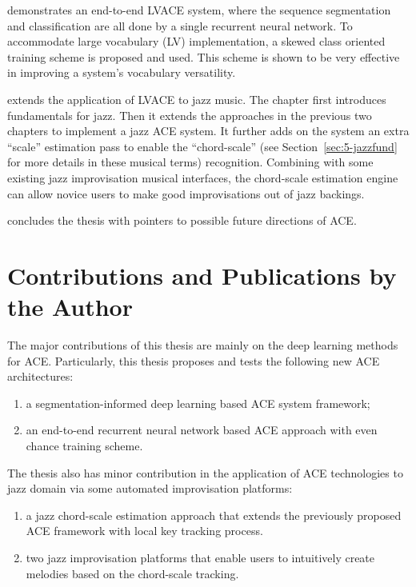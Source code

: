  demonstrates an end-to-end LVACE system, where the sequence segmentation and classification are all done by a single recurrent neural network. To accommodate large vocabulary (LV) implementation, a skewed class oriented training scheme is proposed and used. This scheme is shown to be very effective in improving a system's vocabulary versatility.

 extends the application of LVACE to jazz music. The chapter first introduces fundamentals for jazz. Then it extends the approaches in the previous two chapters to implement a jazz ACE system. It further adds on the system an extra ``scale'' estimation pass to enable the ``chord-scale'' (see Section~\ref{sec:5-jazzfund} for more details in these musical terms) recognition. Combining with some existing jazz improvisation musical interfaces, the chord-scale estimation engine can allow novice users to make good improvisations out of jazz backings.

 concludes the thesis with pointers to possible future directions of ACE.


\section{Contributions and Publications by the Author} \label{sec:1-contribution}
The major contributions of this thesis are mainly on the deep learning methods for ACE. Particularly, this thesis proposes and tests the following new ACE architectures:
\begin{enumerate}
\item a segmentation-informed deep learning based ACE system framework;
\item an end-to-end recurrent neural network based ACE approach with even chance training scheme.
\end{enumerate}

The thesis also has minor contribution in the application of ACE technologies to jazz domain via some automated improvisation platforms:
\begin{enumerate}
\item a jazz chord-scale estimation approach that extends the previously proposed ACE framework with local key tracking process.
\item two jazz improvisation platforms that enable users to intuitively create melodies based on the chord-scale tracking.
\end{enumerate}

